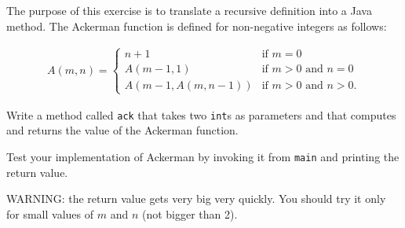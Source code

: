 \begin{exercise}
The purpose of this exercise is to translate a recursive definition
into a Java method.  The Ackerman function is defined for non-negative
integers as follows:

\begin{eqnarray}
A(m, n) = \begin{cases}
              n+1 & \mbox{if } m = 0 \\
        A(m-1, 1) & \mbox{if } m > 0 \mbox{ and } n = 0 \\
A(m-1, A(m, n-1)) & \mbox{if } m > 0 \mbox{ and } n > 0.
\end{cases}
\end{eqnarray}

Write a method called {\tt ack} that takes two {\tt int}s as
parameters and that computes and returns the value
of the Ackerman function.

Test your implementation of Ackerman by invoking it
from {\tt main} and printing the return value.

WARNING: the return value gets very big very quickly.  You should try it
only for small values of $m$ and $n$ (not bigger than 2).

\end{exercise}



